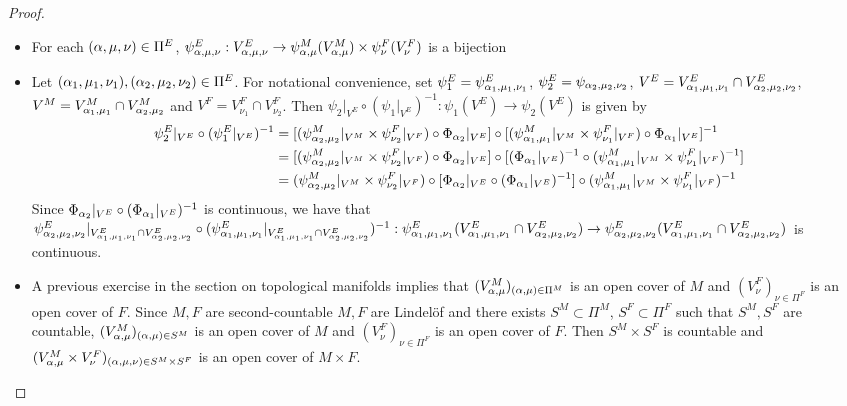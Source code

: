 \documentclass{book}
\begin{document}
\begin{proof}
\begin{enumerate}
\begin{itemize}
\begin{align*}
					& \in \MT_{\H^{n+k}}
				\end{align*}
				\item For each $(\alpha, \mu, \nu) \in \Pi^E$, $\psi^E_{\alpha, \mu, \nu}: V^E_{\alpha, \mu, \nu} \rightarrow \psi^M_{\alpha, \mu}(V^M_{\alpha, \mu}) \times \psi^F_{\nu}(V^F_{\nu})$ is a bijection
				\item Let $(\alpha_1, \mu_1, \nu_1), (\alpha_2, \mu_2, \nu_2) \in \Pi^E$. For notational convenience, set $\psi^E_1 = \psi^E_{\alpha_1, \mu_1, \nu_1}$, $\psi^E_2 = \psi_{\alpha_2, \mu_2, \nu_2}$, $V^E = V^E_{\alpha_1, \mu_1, \nu_1} \cap V^E_{\alpha_2, \mu_2, \nu_2}$, $V^M = V_{\alpha_1, \mu_1}^M \cap V^M_{\alpha_2, \mu_2}$ and $V^F = V^F_{\nu_1} \cap V^F_{\nu_2}$. Then $\psi_2|_{V^E} \circ (\psi_1|_{V^E})^{-1}: \psi_1(V^E) \rightarrow \psi_2(V^E)$ is given by
				\begin{align*}
					\psi^E_2|_{V^E} \circ (\psi^E_1|_{V^E})^{-1}
					& = [(\psi_{\alpha_2, \mu_2}^M|_{V^M} \times \psi_{\nu_2}^F|_{V^F}) \circ \Phi_{\alpha_2}|_{V^E}] \circ [(\psi_{\alpha_1, \mu_1}^M|_{V^M} \times \psi_{\nu_1}^F|_{V^F}) \circ \Phi_{\alpha_1}|_{V^E}]^{-1} \\
					& = [(\psi_{\alpha_2, \mu_2}^M|_{V^M} \times \psi_{\nu_2}^F|_{V^F}) \circ \Phi_{\alpha_2}|_{V^E}] \circ [(\Phi_{\alpha_1}|_{V^E})^{-1} \circ (\psi_{\alpha_1, \mu_1}^M|_{V^M} \times \psi_{\nu_1}^F|_{V^F})^{-1}] \\
					& = (\psi_{\alpha_2, \mu_2}^M|_{V^M} \times \psi_{\nu_2}^F|_{V^F}) \circ [\Phi_{\alpha_2}|_{V^E} \circ (\Phi_{\alpha_1}|_{V^E})^{-1}] \circ (\psi_{\alpha_1, \mu_1}^M|_{V^M} \times \psi_{\nu_1}^F|_{V^F})^{-1}
				\end{align*}
				Since $\Phi_{\alpha_2}|_{V^E} \circ (\Phi_{\alpha_1}|_{V^E})^{-1}$ is continuous, we have that 
				$\psi^E_{\alpha_2, \mu_2, \nu_2}|_{V^E_{\alpha_1, \mu_1, \nu_1} \cap V^E_{\alpha_2, \mu_2, \nu_2}} \circ (\psi^E_{\alpha_1, \mu_1, \nu_1}|_{V^E_{\alpha_1, \mu_1, \nu_1} \cap V^E_{\alpha_2, \mu_2, \nu_2}})^{-1}: \psi^E_{\alpha_1, \mu_1, \nu_1}(V^E_{\alpha_1, \mu_1, \nu_1} \cap V^E_{\alpha_2, \mu_2, \nu_2}) \rightarrow \psi^E_{\alpha_2, \mu_2, \nu_2}(V^E_{\alpha_1, \mu_1, \nu_1} \cap V^E_{\alpha_2, \mu_2, \nu_2})$
				is continuous.
				\item A previous exercise in the section on topological manifolds implies that $(V^M_{\alpha, \mu})_{(\alpha, \mu) \in \Pi^M}$ is an open cover of $M$ and $(V^F_{\nu})_{\nu \in \Pi^F}$ is an open cover of $F$. Since $M,F$ are second-countable $M,F$ are Lindel\"{o}f and there exists $S^M \subset \Pi^M$, $S^F \subset \Pi^F$ such that $S^M, S^F$ are countable, $(V_{\alpha, \mu}^M )_{(\alpha, \mu) \in S^M}$ is an open cover of $M$ and $(V^F_{\nu})_{\nu \in \Pi^F}$ is an open cover of $F$. Then $S^M \times S^F$ is countable and $(V_{\alpha, \mu}^M \times V_{\nu}^F)_{(\alpha, \mu, \nu) \in S^M \times S^F}$ is an open cover of $M \times F$. \\

\end{itemize}
\end{enumerate}
\end{proof}
\end{document}
